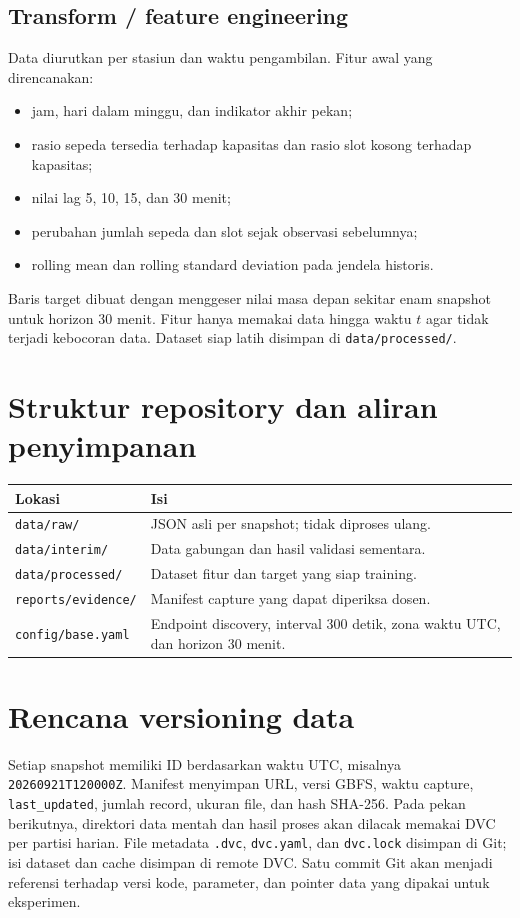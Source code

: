 \documentclass[10pt,a4paper]{article}
\newcommand{\code}[1]{\texttt{#1}}
\begin{document}
\subsection{Transform / feature engineering}
Data diurutkan per stasiun dan waktu pengambilan. Fitur awal yang direncanakan:
\begin{itemize}
  \item jam, hari dalam minggu, dan indikator akhir pekan;
  \item rasio sepeda tersedia terhadap kapasitas dan rasio slot kosong terhadap kapasitas;
  \item nilai lag 5, 10, 15, dan 30 menit;
  \item perubahan jumlah sepeda dan slot sejak observasi sebelumnya;
  \item rolling mean dan rolling standard deviation pada jendela historis.
\end{itemize}
Baris target dibuat dengan menggeser nilai masa depan sekitar enam snapshot
untuk horizon 30 menit. Fitur hanya memakai data hingga waktu $t$ agar tidak
terjadi kebocoran data. Dataset siap latih disimpan di \code{data/processed/}.

\section{Struktur repository dan aliran penyimpanan}
\begin{longtable}{@{}p{}p{}@{}}
\toprule
\textbf{Lokasi} & \textbf{Isi} \\
\midrule
\code{data/raw/} & JSON asli per snapshot; tidak diproses ulang. \\
\code{data/interim/} & Data gabungan dan hasil validasi sementara. \\
\code{data/processed/} & Dataset fitur dan target yang siap training. \\
\code{reports/evidence/} & Manifest capture yang dapat diperiksa dosen. \\
\code{config/base.yaml} & Endpoint discovery, interval 300 detik, zona waktu UTC, dan horizon 30 menit. \\
\bottomrule
\end{longtable}

\section{Rencana versioning data}
Setiap snapshot memiliki ID berdasarkan waktu UTC, misalnya
\code{20260921T120000Z}. Manifest menyimpan URL, versi GBFS, waktu capture,
\code{last\_updated}, jumlah record, ukuran file, dan hash SHA-256. Pada pekan
berikutnya, direktori data mentah dan hasil proses akan dilacak memakai DVC
per partisi harian. File metadata \code{.dvc}, \code{dvc.yaml}, dan
\code{dvc.lock} disimpan di Git; isi dataset dan cache disimpan di remote DVC.
Satu commit Git akan menjadi referensi terhadap versi kode, parameter, dan
pointer data yang dipakai untuk eksperimen.
\end{document}
